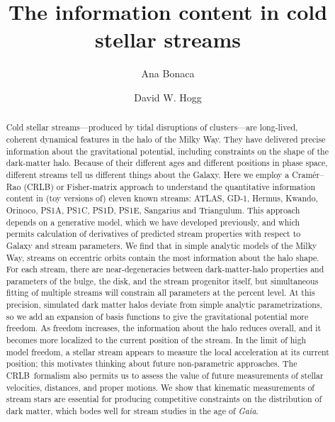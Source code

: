 \documentclass[modern]{aastex62}
\newcommand{\acronym}[1]{{\small{#1}}}
\newcommand{\CRLB}{\acronym{CRLB}}
\begin{document}
\sloppy\sloppypar\raggedbottom\frenchspacing %

\title{The information content in cold stellar streams}


\author[0000-0002-7846-9787]{Ana Bonaca}

\author[0000-0003-2866-9403]{David W. Hogg}

\begin{abstract}\noindent %
Cold stellar streams---produced by tidal disruptions of clusters---are long-lived, coherent dynamical features in the halo of the Milky Way.
They have delivered precise information about the gravitational potential, including constraints on the shape of the dark-matter halo.
Because of their different ages and different positions in phase space, different streams tell us different things about the Galaxy.
Here we employ a Cram\'er--Rao (\CRLB) or Fisher-matrix approach to understand the quantitative information content in (toy versions of) eleven known streams: ATLAS, GD-1, Hermus, Kwando, Orinoco, PS1A, PS1C, PS1D, PS1E, Sangarius and Triangulum.
This approach depends on a generative model, which we have developed previously, and which permits calculation of derivatives of predicted stream properties with respect to Galaxy and stream parameters.
We find that in simple analytic models of the Milky Way, streams on eccentric orbits contain the most information about the halo shape.
For each stream, there are near-degeneracies between dark-matter-halo properties and parameters of the bulge, the disk, and the stream progenitor itself, but simultaneous fitting of multiple streams will constrain all parameters at the percent level.
At this precision, simulated dark matter halos deviate from simple analytic parametrizations, so we add an expansion of basis functions to give the gravitational potential more freedom.
As freedom increases, the information about the halo reduces overall, and it becomes more localized to the current position of the stream.
In the limit of high model freedom, a stellar stream appears to measure the local acceleration at its current position; this motivates thinking about future non-parametric approaches.
The \CRLB\ formalism also permits us to assess the value of future measurements of stellar velocities, distances, and proper motions.
We show that kinematic measurements of stream stars are essential for producing competitive constraints on the distribution of dark matter, which bodes well for stream studies in the age of \textsl{Gaia}.
\end{abstract}
\end{document}
